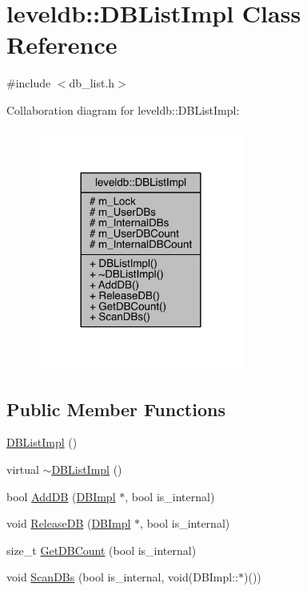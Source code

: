 \hypertarget{classleveldb_1_1_d_b_list_impl}{}\section{leveldb\+:\+:D\+B\+List\+Impl Class Reference}
\label{classleveldb_1_1_d_b_list_impl}


{\ttfamily \#include $<$db\+\_\+list.\+h$>$}



Collaboration diagram for leveldb\+:\+:D\+B\+List\+Impl\+:\nopagebreak
\begin{figure}[H]
\begin{center}
\leavevmode
\includegraphics[width=192pt]{classleveldb_1_1_d_b_list_impl__coll__graph}
\end{center}
\end{figure}
\subsection*{Public Member Functions}
\begin{DoxyCompactItemize}
\item 
\hyperlink{classleveldb_1_1_d_b_list_impl_a183941e8e5f3cbb13e7077b0f225c56a}{D\+B\+List\+Impl} ()
\item 
virtual \hyperlink{classleveldb_1_1_d_b_list_impl_ae0236ffc727854e2be9ceceb5a45a5d7}{$\sim$\+D\+B\+List\+Impl} ()
\item 
bool \hyperlink{classleveldb_1_1_d_b_list_impl_a8ec99d0dd1846e7f512410a9f5d01a75}{Add\+D\+B} (\hyperlink{classleveldb_1_1_d_b_impl}{D\+B\+Impl} $\ast$, bool is\+\_\+internal)
\item 
void \hyperlink{classleveldb_1_1_d_b_list_impl_aee9747bd8905483dde4a213fad40ac70}{Release\+D\+B} (\hyperlink{classleveldb_1_1_d_b_impl}{D\+B\+Impl} $\ast$, bool is\+\_\+internal)
\item 
size\+\_\+t \hyperlink{classleveldb_1_1_d_b_list_impl_a73dd5d51280abb800f1343e491c609b8}{Get\+D\+B\+Count} (bool is\+\_\+internal)
\item 
void \hyperlink{classleveldb_1_1_d_b_list_impl_a0903e5cb81750c76b5d58835cf3c30ba}{Scan\+D\+Bs} (bool is\+\_\+internal, void(D\+B\+Impl\+::$\ast$)())
\end{DoxyCompactItemize}
